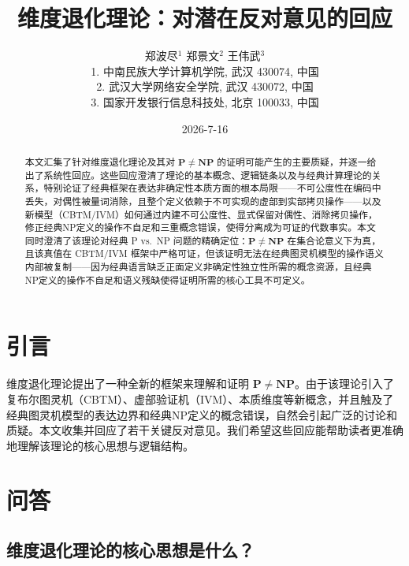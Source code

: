 \documentclass{ctexart}
\begin{document}
	
	\title{\bfseries 维度退化理论：对潜在反对意见的回应}
	\author{郑波尽$^1$ 郑景文$^2$ 王伟武$^3$ \\
		1. 中南民族大学计算机学院, 武汉 430074, 中国\\
		2. 武汉大学网络安全学院, 武汉 430072, 中国\\
		3. 国家开发银行信息科技处, 北京 100033, 中国\\		 
	}
	\date{2026-7-16}
	
	\maketitle
	
	\begin{abstract}
		本文汇集了针对维度退化理论及其对 $\mathbf{P}\neq\mathbf{NP}$ 的证明可能产生的主要质疑，并逐一给出了系统性回应。这些回应澄清了理论的基本概念、逻辑链条以及与经典计算理论的关系，特别论证了经典框架在表达非确定性本质方面的根本局限——不可公度性在编码中丢失，对偶性被量词消除，且整个定义依赖于不可实现的虚部到实部拷贝操作——以及新模型（CBTM/IVM）如何通过内建不可公度性、显式保留对偶性、消除拷贝操作，修正经典NP定义的操作不自足和三重概念错误，使得分离成为可证的代数事实。本文同时澄清了该理论对经典 P vs.\ NP 问题的精确定位：$\mathbf{P}\neq\mathbf{NP}$ 在集合论意义下为真，且该真值在 CBTM/IVM 框架中严格可证，但该证明无法在经典图灵机模型的操作语义内部被复制——因为经典语言缺乏正面定义非确定性独立性所需的概念资源，且经典NP定义的操作不自足和语义残缺使得证明所需的核心工具不可定义。
	\end{abstract}
	
	\section{引言}
	
	维度退化理论\cite{models2026,measure2026}提出了一种全新的框架来理解和证明 $\mathbf{P}\neq\mathbf{NP}$。由于该理论引入了复布尔图灵机（CBTM）、虚部验证机（IVM）、本质维度等新概念，并且触及了经典图灵机模型的表达边界和经典NP定义的概念错误，自然会引起广泛的讨论和质疑。本文收集并回应了若干关键反对意见。我们希望这些回应能帮助读者更准确地理解该理论的核心思想与逻辑结构。
	
	\section{问答}
	
	\subsection{维度退化理论的核心思想是什么？}
	
\end{document}

